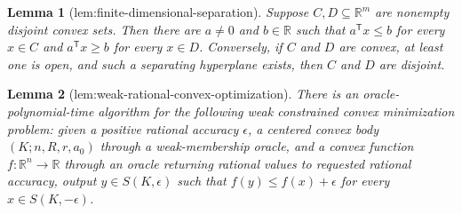 \documentclass{article}
\newtheorem{lemma}{Lemma}
\begin{document}
\begin{lemma}[lem:finite-dimensional-separation]\label{lem:finite-dimensional-separation}
Suppose \(C,D\subseteq\mathbb R^m\) are nonempty disjoint convex sets. Then there are \(a\ne0\) and \(b\in\mathbb R\) such that \(a^{\mathsf T}x\le b\) for every \(x\in C\) and \(a^{\mathsf T}x\ge b\) for every \(x\in D\). Conversely, if \(C\) and \(D\) are convex, at least one is open, and such a separating hyperplane exists, then \(C\) and \(D\) are disjoint.
\end{lemma}

\begin{lemma}[lem:weak-rational-convex-optimization]\label{lem:weak-rational-convex-optimization}
There is an oracle-polynomial-time algorithm for the following weak constrained convex minimization problem: given a positive rational accuracy \(\epsilon\), a centered convex body \((K;n,R,r,a_0)\) through a weak-membership oracle, and a convex function \(f:\mathbb R^n\to\mathbb R\) through an oracle returning rational values to requested rational accuracy, output \(y\in S(K,\epsilon)\) such that \(f(y)\le f(x)+\epsilon\) for every \(x\in S(K,-\epsilon)\).
\end{lemma}
\end{document}
